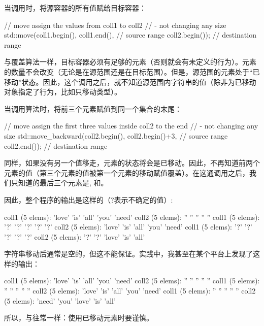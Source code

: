 当调用时，将源容器的所有值赋给目标容器：

\begin{cppcode}
// move assign the values from coll1 to coll2
// - not changing any size
std::move(coll1.begin(), coll1.end(), // source range
		  coll2.begin()); // destination range
\end{cppcode}

与覆盖算法一样，目标容器必须有足够的元素（否则就会有未定义的行为）。元素的数量不会改变（无论是在源范围还是在目标范围）。但是，源范围的元素处于“已移动”状态。因此，这个调用之后，就不知道源范围内字符串的值（除非为已移动对象指定了行为，比如只移动类型）。

当调用算法时，将前三个元素赋值到同一个集合的末尾：

\begin{cppcode}
// move assign the first three values inside coll2 to the end
// - not changing any size
std::move_backward(coll2.begin(), coll2.begin()+3, // source range
				   coll2.end()); // destination range
\end{cppcode}

同样，如果没有另一个值移走，元素的状态将会是已移动。因此，不再知道前两个元素的值（第三个元素的值被第一个元素的移动赋值覆盖）。在这通调用之后，我们只知道的最后三个元素是, 和。

因此，整个程序的输出是这样的（?表示不确定的值）:

\begin{outputcode}
coll1 (5 elems): 'love' 'is' 'all' 'you' 'need'
coll2 (5 elems): '' '' '' '' ''
coll1 (5 elems): '?' '?' '?' '?' '?'
coll2 (5 elems): 'love' 'is' 'all' 'you' 'need'
coll1 (5 elems): '?' '?' '?' '?' '?'
coll2 (5 elems): '?' '?' 'love' 'is' 'all'
\end{outputcode}

字符串移动后通常是空的，但这不能保证。实践中，我甚至在某个平台上发现了这样的输出：

\begin{outputcode}
coll1 (5 elems): 'love' 'is' 'all' 'you' 'need'
coll2 (5 elems): '' '' '' '' ''
coll1 (5 elems): '' '' '' '' ''
coll2 (5 elems): 'love' 'is' 'all' 'you' 'need'
coll1 (5 elems): '' '' '' '' ''
coll2 (5 elems): 'need' 'you' 'love' 'is' 'all'
\end{outputcode}


所以，与往常一样：使用已移动元素时要谨慎。

